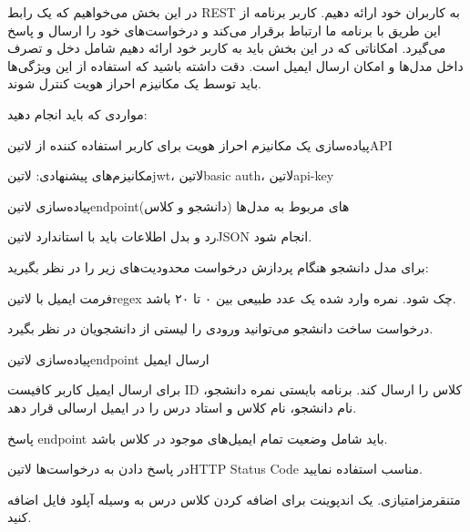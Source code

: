 \documentclass{../assignment}
\begin{document}


در این بخش می‌خواهیم که یک رابط REST به کاربران خود ارائه دهیم. کاربر برنامه از این طریق با برنامه ما ارتباط برقرار می‌کند و درخواست‌های خود را ارسال و پاسخ می‌گیرد. امکاناتی که در این بخش باید به کاربر خود ارائه دهیم شامل دخل و تصرف داخل مدل‌ها و امکان ارسال ایمیل است. دقت داشته باشید که استفاده از این ویژگی‌ها باید توسط یک مکانیزم احراز هویت کنترل شوند.

مواردی که باید انجام دهید:


 پیاده‌سازی یک مکانیزم احراز هویت برای کاربر استفاده کننده از ‌لاتین{API}


 مکانیزم‌های پیشنهادی‌: ‌لاتین{jwt}، ‌لاتین{basic auth}، ‌لاتین{api-key}


 پیاده‌سازی ‌لاتین{endpoint}های مربوط به مدل‌ها (دانشجو و کلاس)


 رد و بدل اطلاعات باید با استاندارد ‌لاتین{JSON} انجام شود.

 برای مدل دانشجو هنگام پردازش درخواست محدودیت‌های زیر را در نظر بگیرید:


 فرمت ایمیل با ‌لاتین{regex} چک شود.
 نمره وارد شده یک عدد طبیعی بین ۰ تا ۲۰ باشد.


 درخواست ساخت دانشجو می‌توانید ورودی را لیستی از دانشجویان در نظر بگیرد.


 پیاده‌سازی ‌لاتین{endpoint} ارسال ایمیل


 برای ارسال ایمیل کاربر کافیست ID کلاس را ارسال کند. برنامه بایستی نمره دانشجو، نام دانشجو، نام کلاس و استاد درس را در ایمیل ارسالی قرار دهد.

 پاسخ endpoint باید شامل وضعیت تمام ایمیل‌های موجود در کلاس باشد.


 در پاسخ دادن به درخواست‌ها ‌لاتین{HTTP Status Code} مناسب استفاده نمایید.

 ‌متن{قرمز}{امتیازی.} یک اندپوینت برای اضافه کردن کلاس درس به وسیله آپلود فایل اضافه کنید.

\end{document}
